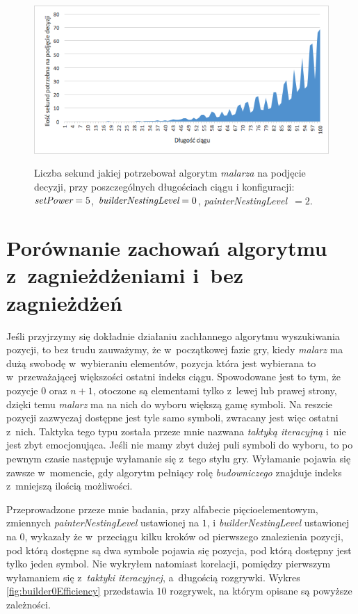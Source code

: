 \documentclass[document]{xmgr}
\begin{document}
\begin{figure}[tbh]
    \centering
    \caption{Liczba sekund jakiej potrzebował algorytm \emph{malarza} na podjęcie decyzji, przy poszczególnych długościach ciągu i konfiguracji: $\emph{setPower}=5$, $\emph{builderNestingLevel}=0$, \emph{painterNestingLevel}~$=2$.}
    \includegraphics[width = \textwidth]{images2/timePainter2Builder0}
    \label{fig:painter2builder0}
\end{figure}




\section{Porównanie zachowań algorytmu z~zagnieżdżeniami i~bez zagnieżdżeń}
Jeśli przyjrzymy się dokładnie działaniu zachłannego algorytmu wyszukiwania pozycji, to bez trudu zauważymy, że w~początkowej fazie gry, kiedy \emph{malarz} ma dużą swobodę w~wybieraniu elementów, pozycja która jest wybierana to w~przeważającej większości ostatni indeks ciągu. Spowodowane jest to tym, że pozycje $0$ oraz $n+1$, otoczone są elementami tylko z~lewej lub prawej strony, dzięki temu \emph{malarz} ma na nich do wyboru większą gamę symboli. Na reszcie pozycji zazwyczaj dostępne jest tyle samo symboli, zwracany jest więc ostatni z~nich. Taktyka tego typu została przeze mnie nazwana \emph{taktyką iteracyjną} i~nie jest zbyt emocjonująca. Jeśli nie mamy zbyt dużej puli symboli do wyboru, to po pewnym czasie następuje wyłamanie się z~tego stylu gry. Wyłamanie pojawia się zawsze w~momencie, gdy algorytm pełniący rolę \emph{budowniczego} znajduje indeks z~mniejszą ilością możliwości. 

Przeprowadzone przeze mnie badania, przy alfabecie pięcioelementowym, zmiennych \emph{painterNestingLevel} ustawionej na $1$, i \emph{builderNestingLevel} ustawionej na $0$, wykazały że w~przeciągu kilku kroków od pierwszego znalezienia pozycji, pod którą dostępne są dwa symbole pojawia się pozycja, pod którą dostępny jest tylko jeden symbol. Nie wykryłem natomiast korelacji, pomiędzy pierwszym wyłamaniem się z~\emph{taktyki iteracyjnej}, a~długością rozgrywki. Wykres \ref{fig:builder0Efficiency} przedstawia $10$ rozgrywek, na którym opisane są powyższe zależności.
 
\end{document}
